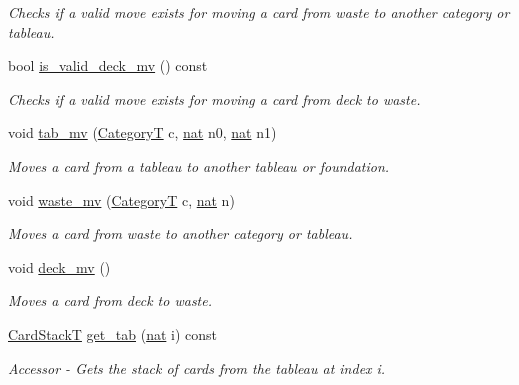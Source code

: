 \begin{DoxyCompactItemize}
\begin{DoxyCompactList}\small\item\em Checks if a valid move exists for moving a card from waste to another category or tableau. \end{DoxyCompactList}\item 
bool \hyperlink{class_board_t_a1cd8b938fe085438ab670b652081ac1d}{is\+\_\+valid\+\_\+deck\+\_\+mv} () const
\begin{DoxyCompactList}\small\item\em Checks if a valid move exists for moving a card from deck to waste. \end{DoxyCompactList}\item 
void \hyperlink{class_board_t_a812f5c08de1db6cc2f2e102d2cf64980}{tab\+\_\+mv} (\hyperlink{_card_types_8h_aa77f81f8d4c8aa57046a50ca32d6b7b4}{CategoryT} c, \hyperlink{_card_types_8h_a56638ee9d162e8cce3a15f92d2023d6e}{nat} n0, \hyperlink{_card_types_8h_a56638ee9d162e8cce3a15f92d2023d6e}{nat} n1)
\begin{DoxyCompactList}\small\item\em Moves a card from a tableau to another tableau or foundation. \end{DoxyCompactList}\item 
void \hyperlink{class_board_t_adb96accaa92d62594a5cc83e0574a1ed}{waste\+\_\+mv} (\hyperlink{_card_types_8h_aa77f81f8d4c8aa57046a50ca32d6b7b4}{CategoryT} c, \hyperlink{_card_types_8h_a56638ee9d162e8cce3a15f92d2023d6e}{nat} n)
\begin{DoxyCompactList}\small\item\em Moves a card from waste to another category or tableau. \end{DoxyCompactList}\item 
\mbox{\label{class_board_t_a548e3e518666a6f38b49e072a88a6d2c}} 
void \hyperlink{class_board_t_a548e3e518666a6f38b49e072a88a6d2c}{deck\+\_\+mv} ()
\begin{DoxyCompactList}\small\item\em Moves a card from deck to waste. \end{DoxyCompactList}\item 
\hyperlink{_card_stack_8h_a29a6854caf5fec306ee8fc0c6b453837}{Card\+StackT} \hyperlink{class_board_t_a12d2088a51a0ac7d08294830f9bad379}{get\+\_\+tab} (\hyperlink{_card_types_8h_a56638ee9d162e8cce3a15f92d2023d6e}{nat} i) const
\begin{DoxyCompactList}\small\item\em Accessor -\/ Gets the stack of cards from the tableau at index i. \end{DoxyCompactList}\item 

\end{DoxyCompactItemize}
